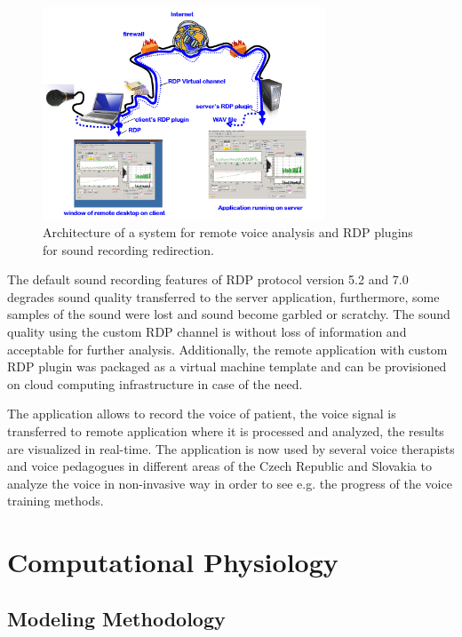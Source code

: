 \begin{figure}[hbt]
    \centering
     \includegraphics[width=0.75\textwidth]{schemasystemu.png}  
    \caption{Architecture of a system for remote voice analysis and RDP plugins for sound recording redirection.}
    \label{fig:architecturesound}
\end{figure}

The default sound recording features of RDP protocol version 5.2 and 7.0 degrades sound quality transferred to the server application, furthermore, some samples of the sound were lost and sound become garbled or scratchy. The sound quality using the custom RDP channel is without loss of information and acceptable for further analysis. Additionally, the remote application with custom RDP plugin was packaged as a virtual machine template and can be provisioned on cloud computing infrastructure in case of the need.

The application allows to record the voice of patient, the voice signal is transferred to remote application where it is processed and analyzed, the results are visualized in real-time. The application is now used by several voice therapists and voice pedagogues in different areas of the Czech Republic and Slovakia to analyze the voice in non-invasive way in order to see e.g. the progress of the voice training methods.

\section{Computational Physiology}
\label{sec:resultsestimation}

\subsection{Modeling Methodology}

